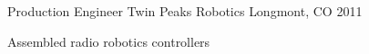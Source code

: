 \begin{cventries}
  \cventry
    {Production Engineer} %
    {Twin Peaks Robotics} %
    {Longmont, CO} %
    {2011} %
    {
      \begin{cvitems} %
        \item {Assembled radio robotics controllers}
      \end{cvitems}
    }
   
\end{cventries}
